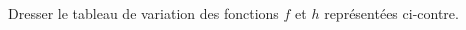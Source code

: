 
\begin{exercice}\label{exoSeconde-0072}


%   

    \begin{multicols}{2}
        \begin{center}
            
        \end{center}

        \columnbreak

    Dresser le tableau de variation des fonctions \( f\) et \( h\) représentées ci-contre.

    \end{multicols}

\end{exercice}
